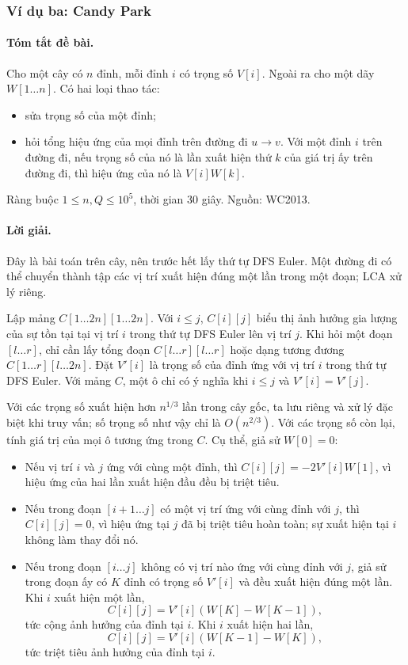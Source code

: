 \documentclass[11pt]{article}
\begin{document}
\subsubsection{Ví dụ ba: Candy Park}

\paragraph{Tóm tắt đề bài.}
Cho một cây có \(n\) đỉnh, mỗi đỉnh \(i\) có trọng số \(V[i]\). Ngoài ra cho
một dãy \(W[1\ldots n]\). Có hai loại thao tác:
\begin{itemize}
  \item sửa trọng số của một đỉnh;
  \item hỏi tổng hiệu ứng của mọi đỉnh trên đường đi \(u\to v\). Với một đỉnh
  \(i\) trên đường đi, nếu trọng số của nó là lần xuất hiện thứ \(k\) của giá
  trị ấy trên đường đi, thì hiệu ứng của nó là \(V[i]W[k]\).
\end{itemize}
Ràng buộc \(1\le n,Q\le10^5\), thời gian 30 giây. Nguồn: WC2013.

\paragraph{Lời giải.}
Đây là bài toán trên cây, nên trước hết lấy thứ tự DFS Euler. Một đường đi có
thể chuyển thành tập các vị trí xuất hiện đúng một lần trong một đoạn; LCA xử
lý riêng.

Lập mảng \(C[1\ldots 2n][1\ldots 2n]\). Với \(i\le j\), \(C[i][j]\) biểu thị
ảnh hưởng gia lượng của sự tồn tại tại vị trí \(i\) trong thứ tự DFS Euler lên
vị trí \(j\). Khi hỏi một đoạn \([l\ldots r]\), chỉ cần lấy tổng đoạn
\(C[l\ldots r][l\ldots r]\) hoặc dạng tương đương \(C[1\ldots r][l\ldots 2n]\).
Đặt \(V'[i]\) là trọng số của đỉnh ứng với vị trí \(i\) trong thứ tự DFS Euler.
Với mảng \(C\), một ô chỉ có ý nghĩa khi \(i\le j\) và \(V'[i]=V'[j]\).

Với các trọng số xuất hiện hơn \(n^{1/3}\) lần trong cây gốc, ta lưu riêng và
xử lý đặc biệt khi truy vấn; số trọng số như vậy chỉ là \(O(n^{2/3})\). Với
các trọng số còn lại, tính giá trị của mọi ô tương ứng trong \(C\). Cụ thể, giả
sử \(W[0]=0\):
\begin{itemize}
  \item Nếu vị trí \(i\) và \(j\) ứng với cùng một đỉnh, thì
  \(C[i][j]=-2V'[i]W[1]\), vì hiệu ứng của hai lần xuất hiện đầu đều bị triệt
  tiêu.
  \item Nếu trong đoạn \([i+1\ldots j]\) có một vị trí ứng với cùng đỉnh với
  \(j\), thì \(C[i][j]=0\), vì hiệu ứng tại \(j\) đã bị triệt tiêu hoàn toàn;
  sự xuất hiện tại \(i\) không làm thay đổi nó.
  \item Nếu trong đoạn \([i\ldots j]\) không có vị trí nào ứng với cùng đỉnh
  với \(j\), giả sử trong đoạn ấy có \(K\) đỉnh có trọng số \(V'[i]\) và đều
  xuất hiện đúng một lần. Khi \(i\) xuất hiện một lần,
  \[
    C[i][j]=V'[i](W[K]-W[K-1]),
  \]
  tức cộng ảnh hưởng của đỉnh tại \(i\). Khi \(i\) xuất hiện hai lần,
  \[
    C[i][j]=V'[i](W[K-1]-W[K]),
  \]
  tức triệt tiêu ảnh hưởng của đỉnh tại \(i\).
\end{itemize}
\end{document}
